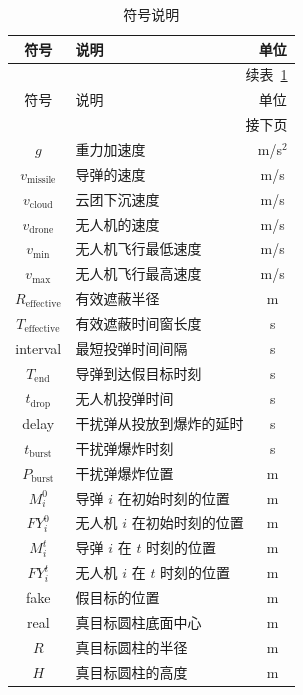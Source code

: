 \documentclass[withoutpreface,bwprint]{cumcmthesis} %
\begin{document}
\begin{longtable}{c p{} c}
	\caption{符号说明}\label{tab:001}\\
	\hline
	符号 & 说明 & 单位 \\
	\hline
	\endfirsthead
	
	\multicolumn{3}{r}{续表~\ref{tab:001}}\\
	\hline
	符号 & 说明 & 单位 \\
	\hline
	\endhead
	
	\hline
	\multicolumn{3}{r}{接下页}\\
	\endfoot
	
	\hline
	\endlastfoot
	
	$g$ & 重力加速度 & m/s$^{2}$ \\
	\hline
	$v_{\text{missile}}$ & 导弹的速度 & m/s \\
	\hline
	$v_{\text{cloud}}$ & 云团下沉速度 & m/s \\
	\hline
	$v_{\text{drone}}$ & 无人机的速度 & m/s \\
	\hline
	$v_{\min}$ & 无人机飞行最低速度 & m/s \\
	\hline
	$v_{\max}$ & 无人机飞行最高速度 & m/s \\
	\hline
	$R_{\text{effective}}$ & 有效遮蔽半径 & m \\
	\hline
	$T_{\text{effective}}$ & 有效遮蔽时间窗长度 & s \\
	\hline
	interval & 最短投弹时间间隔 & s \\
	\hline
	$T_{\text{end}}$ & 导弹到达假目标时刻 & s \\
	\hline
	$t_{\text{drop}}$ & 无人机投弹时间 & s \\
	\hline
	delay & 干扰弹从投放到爆炸的延时 & s \\
	\hline
	$t_{\text{burst}}$ & 干扰弹爆炸时刻 & s \\
	\hline
	$P_{\text{burst}}$ & 干扰弹爆炸位置 & m \\
	\hline
	$M_i^{0}$ & 导弹 $i$ 在初始时刻的位置 & m \\
	\hline
	$FY_i^{0}$ & 无人机 $i$ 在初始时刻的位置 & m \\
	\hline
	$M_i^{t}$ & 导弹 $i$ 在 $t$ 时刻的位置 & m \\
	\hline
	$FY_i^{t}$ & 无人机 $i$ 在 $t$ 时刻的位置 & m \\
	\hline
	fake & 假目标的位置 & m \\
	\hline
	real & 真目标圆柱底面中心 & m \\
	\hline
	$R$ & 真目标圆柱的半径 & m \\
	\hline
	$H$ & 真目标圆柱的高度 & m \\

\end{longtable}
\end{document}
